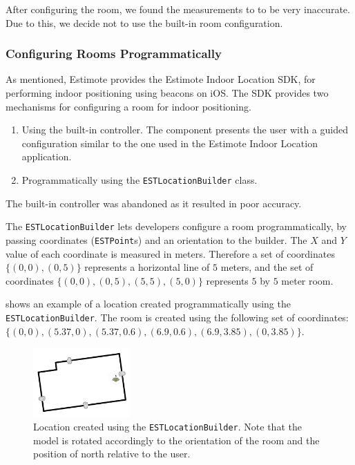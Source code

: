 After configuring the room, 
we found the measurements to to be very inaccurate.
Due to this, we decide not to use the built-in room configuration. 

\subsubsection{Configuring Rooms Programmatically}
As mentioned, Estimote provides the Estimote Indoor Location SDK, 
for performing indoor positioning using beacons on iOS. 
The SDK provides two mechanisms for configuring a room for indoor positioning.

\begin{enumerate}
\item Using the built-in controller. The component presents the user with a guided configuration similar to the one used in the Estimote Indoor Location application.
\item Programmatically using the \texttt{ESTLocationBuilder} class.
\end{enumerate}

The built-in controller was abandoned as it resulted in poor accuracy.

The \texttt{ESTLocationBuilder} lets developers configure a room programmatically, 
by passing coordinates (\texttt{ESTPoint}s) and an orientation to the builder. 
The $X$ and $Y$ value of each coordinate is measured in meters. 
Therefore a set of coordinates $\{(0, 0), (0, 5)\}$ represents a horizontal line of $5$ meters, 
and the set of coordinates $\{(0,0),(0,5),(5,5),(5,0)\}$ represents $5$ by $5$ meter room.

 shows an example of a location created programmatically using the \texttt{ESTLocationBuilder}. The room is created using the following set of coordinates: $\{(0, 0), (5.37, 0), (5.37, 0.6), (6.9, 0.6), (6.9, 3.85), (0, 3.85)\}$.

\begin{figure}[!htb]
  \centering
  \includegraphics[width=0.33\textwidth]{images/living-room}
  \caption{Location created using the \texttt{ESTLocationBuilder}. Note that the model is rotated accordingly to the orientation of the room and the position of north relative to the user.}
  \label{fig:estlocationbuilder-livingroom}
\end{figure}

